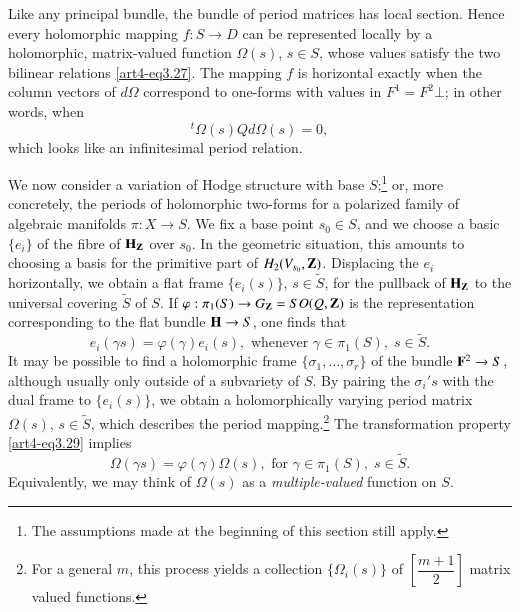 Like any principal bundle, the bundle of period matrices has local section. Hence every holomorphic mapping $f : S \to D$ can be represented locally by a holomorphic, matrix-valued function $\Omega(s)$, $s \in S$, whose values satisfy the two bilinear relations \eqref{art4-eq3.27}. The mapping $f$ is horizontal exactly when the column vectors of $d \Omega$ correspond to one-forms with values in $F^1 = F^2 \bot$; in other words, when
\begin{equation}
{}^t \Omega (s) Q d \Omega (s) = 0,
\label{art4-eq3.28}
\end{equation}
which looks like an infinitesimal period relation.

We now consider a variation of Hodge structure with base $S$;\footnote[15]{The assumptions made at the beginning of this section still apply.} or, more concretely, the periods of holomorphic two-forms for a polarized family of algebraic manifolds $\pi: X \to S$. We fix a base point $s_0 \in S$, and we choose a basic $\{e_i\}$ of the fibre of $\mathbf{H}_{\mathbf{Z}}$ over $s_0$. In the geometric situation, this amounts to choosing a basis for the primitive part of $H_2 (V_{s_0}, \mathbf{Z})$. Displacing the $e_i$ horizontally, we obtain a flat frame $\{e_i(s)\}$, $s \in \tilde{S}$, for the pullback of $\mathbf{H}_{\mathbf{Z}}$ to the universal covering $\tilde{S}$ of $S$. If $\varphi : \pi_1 (S) \to G_{\mathbf{Z}} = SO (Q, \mathbf{Z})$ is the representation corresponding to the flat bundle $\mathbf{H} \to S$, one finds that 
\begin{equation}
e_i (\gamma s ) = \varphi (\gamma) e_i (s), \text{ whenever } \gamma \in \pi_1 (S), \; s \in \tilde{S}. 
\label{art4-eq3.29}
\end{equation}
It may be possible to find a holomorphic frame $\{\sigma_1, \ldots, \sigma_r\}$ of the bundle $\mathbf{F}^2 \to S$, although usually only outside of a subvariety of $S$. By pairing the $\sigma_i's$ with the dual frame to $\{e_i (s)\}$, we obtain a holomorphically varying period matrix $\Omega (s)$, $s \in \tilde{S}$, which describes the period mapping.\footnote[16]{For a general $m$, this process yields a collection $\{\Omega_i (s)\}$ of $\left[\dfrac{m+1}{2}\right]$ matrix valued functions.} The transformation property \eqref{art4-eq3.29} implies 
\begin{equation}
\Omega (\gamma s) = \varphi (\gamma) \Omega (s), \text{ for } \gamma \in \pi_1 (S), \; s \in \tilde{S}.  \label{art4-eq3.30}
\end{equation}
Equivalently, we may think of $\Omega (s)$ as a \textit{multiple-valued} function on $S$.

